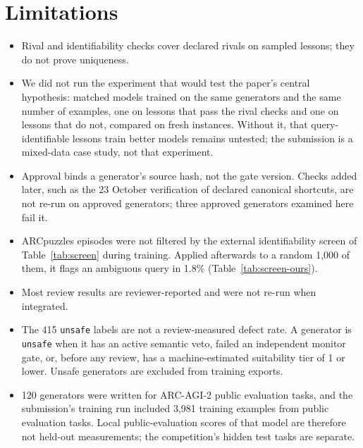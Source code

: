 \documentclass[11pt]{article}
\begin{document}
\section{Limitations}
\begin{itemize}[nosep]
  \item Rival and identifiability checks cover declared rivals on sampled lessons; they do not prove uniqueness.
  \item We did not run the experiment that would test the paper's central hypothesis: matched models trained on the same generators and the same number of examples, one on lessons that pass the rival checks and one on lessons that do not, compared on fresh instances. Without it, that query-identifiable lessons train better models remains untested; the submission is a mixed-data case study, not that experiment.
  \item Approval binds a generator's source hash, not the gate version. Checks added later, such as the 23 October verification of declared canonical shortcuts, are not re-run on approved generators; three approved generators examined here fail it.
  \item ARCpuzzles episodes were not filtered by the external identifiability screen of Table~\ref{tab:screen} during training. Applied afterwards to a random 1,000 of them, it flags an ambiguous query in 1.8\% (Table~\ref{tab:screen-ours}).
  \item Most review results are reviewer-reported and were not re-run when integrated.
  \item The 415 \texttt{unsafe} labels are not a review-measured defect rate. A generator is \texttt{unsafe} when it has an active semantic veto, failed an independent monitor gate, or, before any review, has a machine-estimated suitability tier of 1 or lower. Unsafe generators are excluded from training exports.
  \item 120 generators were written for ARC-AGI-2 public evaluation tasks, and the submission's training run included 3,981 training examples from public evaluation tasks. Local public-evaluation scores of that model are therefore not held-out measurements; the competition's hidden test tasks are separate.
\end{itemize}
\end{document}
